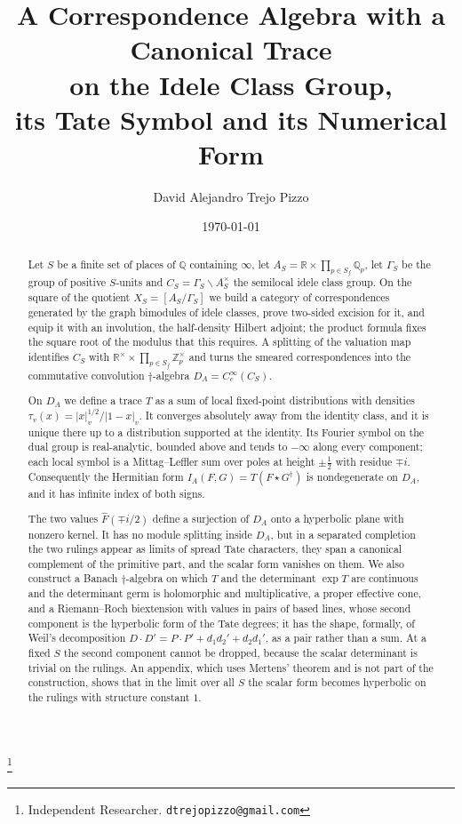 \documentclass[11pt]{amsart}
\theoremstyle{definition}
\theoremstyle{remark}
\newcommand{\R}{\mathbb R}
\newcommand{\Z}{\mathbb Z}
\newcommand{\Q}{\mathbb Q}
\begin{document}
\title[A correspondence algebra on the idele class group]
{A Correspondence Algebra with a Canonical Trace\\
on the Idele Class Group,\\
its Tate Symbol and its Numerical Form}

\author{David Alejandro Trejo Pizzo}
\thanks{Independent Researcher. \texttt{dtrejopizzo@gmail.com}}

\date{\today}

\begin{abstract}
Let $S$ be a finite set of places of $\Q$ containing $\infty$, let
$A_S=\R\times\prod_{p\in S_f}\Q_p$, let $\Gamma_S$ be the group of positive
$S$-units and $C_S=\Gamma_S\backslash A_S^{\times}$ the semilocal idele class
group.  On the square of the quotient $X_S=[A_S/\Gamma_S]$ we build a category
of correspondences generated by the graph bimodules of idele classes, prove
two-sided excision for it, and equip it with an involution, the half-density
Hilbert adjoint; the product formula fixes the square root of the modulus
that this requires.  A splitting of the valuation map identifies $C_S$ with
$\R^{\times}\times\prod_{p\in S_f}\Z_p^{\times}$ and turns the smeared
correspondences into the commutative convolution $\dagger$-algebra
$D_A=C_c^{\infty}(C_S)$.

On $D_A$ we define a trace $T$ as a sum of local fixed-point distributions
with densities $\tau_v(x)=|x|_v^{1/2}/|1-x|_v$.  It converges absolutely away
from the identity class, and it is unique there up to a distribution
supported at the identity.  Its Fourier symbol on the dual group is
real-analytic, bounded above and tends to $-\infty$ along every component;
each local symbol is a Mittag--Leffler sum over poles at height $\pm\frac12$
with residue $\mp i$.  Consequently the Hermitian form
$I_A(F,G)=T(F\star G^{\dagger})$ is nondegenerate on $D_A$, and it has
infinite index of both signs.

The two values $\widehat F(\mp i/2)$ define a surjection of $D_A$ onto a
hyperbolic plane with nonzero kernel.  It has no module splitting inside
$D_A$, but in a separated completion the two rulings appear as limits of
spread Tate characters, they span a canonical complement of the primitive
part, and the scalar form vanishes on them.  We also construct a Banach
$\dagger$-algebra on which $T$ and the determinant $\exp T$ are continuous
and the determinant germ is holomorphic and multiplicative, a proper
effective cone, and a Riemann--Roch biextension with values in pairs of based
lines, whose second component is the hyperbolic form of the Tate degrees; it
has the shape, formally, of Weil's decomposition $D\cdot D'=P\cdot
P'+d_1d_2'+d_2d_1'$, as a pair rather than a sum.  At a fixed $S$ the second
component cannot be dropped, because the scalar determinant is trivial on the
rulings.  An appendix, which uses Mertens' theorem and is not part of the
construction, shows that in the limit over all $S$ the scalar form becomes
hyperbolic on the rulings with structure constant $1$.
\end{abstract}
\end{document}
